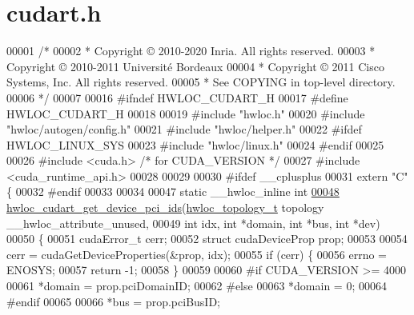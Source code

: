 \hypertarget{a00155_source}{}\section{cudart.\+h}
\label{a00155_source}

\begin{DoxyCode}
00001 \textcolor{comment}{/*}
00002 \textcolor{comment}{ * Copyright © 2010-2020 Inria.  All rights reserved.}
00003 \textcolor{comment}{ * Copyright © 2010-2011 Université Bordeaux}
00004 \textcolor{comment}{ * Copyright © 2011 Cisco Systems, Inc.  All rights reserved.}
00005 \textcolor{comment}{ * See COPYING in top-level directory.}
00006 \textcolor{comment}{ */}
00007 
00016 \textcolor{preprocessor}{#ifndef HWLOC\_CUDART\_H}
00017 \textcolor{preprocessor}{#define HWLOC\_CUDART\_H}
00018 
00019 \textcolor{preprocessor}{#include "hwloc.h"}
00020 \textcolor{preprocessor}{#include "hwloc/autogen/config.h"}
00021 \textcolor{preprocessor}{#include "hwloc/helper.h"}
00022 \textcolor{preprocessor}{#ifdef HWLOC\_LINUX\_SYS}
00023 \textcolor{preprocessor}{#include "hwloc/linux.h"}
00024 \textcolor{preprocessor}{#endif}
00025 
00026 \textcolor{preprocessor}{#include <cuda.h>} \textcolor{comment}{/* for CUDA\_VERSION */}
00027 \textcolor{preprocessor}{#include <cuda\_runtime\_api.h>}
00028 
00029 
00030 \textcolor{preprocessor}{#ifdef \_\_cplusplus}
00031 \textcolor{keyword}{extern} \textcolor{stringliteral}{"C"} \{
00032 \textcolor{preprocessor}{#endif}
00033 
00034 
00047 \textcolor{keyword}{static} \_\_hwloc\_inline \textcolor{keywordtype}{int}
\hyperlink{a00220_gad8b701d9a34923e34bd58defd4c1e704}{00048} \hyperlink{a00220_gad8b701d9a34923e34bd58defd4c1e704}{hwloc\_cudart\_get\_device\_pci\_ids}(\hyperlink{a00186_ga9d1e76ee15a7dee158b786c30b6a6e38}{hwloc\_topology\_t} topology 
      \_\_hwloc\_attribute\_unused,
00049                                 \textcolor{keywordtype}{int} idx, \textcolor{keywordtype}{int} *domain, \textcolor{keywordtype}{int} *bus, \textcolor{keywordtype}{int} *dev)
00050 \{
00051   cudaError\_t cerr;
00052   \textcolor{keyword}{struct }cudaDeviceProp prop;
00053 
00054   cerr = cudaGetDeviceProperties(&prop, idx);
00055   \textcolor{keywordflow}{if} (cerr) \{
00056     errno = ENOSYS;
00057     \textcolor{keywordflow}{return} -1;
00058   \}
00059 
00060 \textcolor{preprocessor}{#if CUDA\_VERSION >= 4000}
00061   *domain = prop.pciDomainID;
00062 \textcolor{preprocessor}{#else}
00063   *domain = 0;
00064 \textcolor{preprocessor}{#endif}
00065 
00066   *bus = prop.pciBusID;

\end{DoxyCode}
